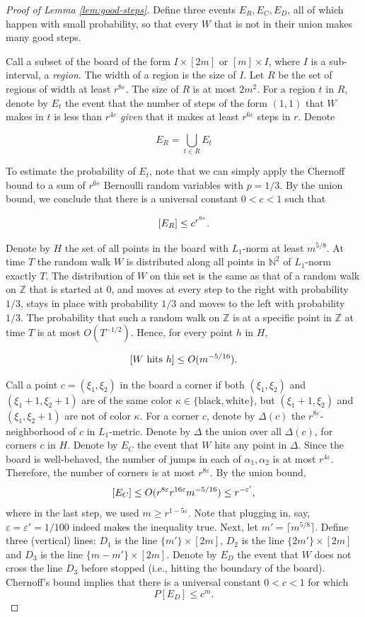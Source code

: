 \documentclass[10pt,a4paper]{article}
\theoremstyle{definition}%
\theoremstyle{plain}
\let\Pr\relax
\DeclareMathOperator*{\Pr}{\mathbb{P}}
\newcommand{\N}{\mathbb N}
\newcommand{\Z}{\mathbb Z}
\newcommand{\eps}{\varepsilon}
\begin{document}
\begin{proof}[Proof of Lemma \ref{lem:good-steps}]
    Define three events $E_R, E_C, E_D$, all of which happen with small probability, so that every $W$ that
is not in their union makes many good steps.

Call a subset of the board of the form $I \times [2m]$ or $[m] \times I$, where $I$ is a sub-interval, a \emph{region}.
The width of a region is the size of $I$. Let $R$ be the set of regions of width at least $r^{8\eps}$. The size
of $R$ is at most $2m^2$. For a region $t$ in $R$, denote by $E_t$ the event that the number of steps of the
form $(1, 1)$ that $W$ makes in $t$ is less than $r^{4\eps}$ \emph{given} that it makes at least $r^{6\eps}$ steps in $r$. Denote

\[
E_R = \bigcup_{t\in R} E_t
\]

To estimate the probability of $E_t$, note that we can simply apply the Chernoff bound to a sum of $r^{6\eps}$ Bernoulli random variables with $p = 1/3$. By the union bound, we conclude that there is a universal constant $0<c<1$ such that

\[
\Pr[E_R] \leq c^{r^{6\eps}}.
\]

Denote by $H$ the set of all points in the board with $L_1$-norm at least $m^{5/8}$. At time $T$ the
random walk $W$ is distributed along all points in $\N^2$ of $L_1$-norm exactly $T$. The distribution of
$W$ on this set is the same as that of a random walk on $\Z$ that is started at $0$, and moves at every
step to the right with probability $1/3$, stays in place with probability $1/3$ and moves to the left with probability $1/3$. The probability
that such a random walk on $\Z$ is at a specific point in $\Z$ at time $T$ is at most $O(T^{-1/2})$. Hence, for
every point $h$ in $H$,

\[
\Pr[W \text{ hits } h]\leq O(m^{-5/16}).
\]

Call a point $c = (\xi_1, \xi_2)$ in the board a corner if both $(\xi_1, \xi_2)$ and $(\xi_1 + 1, \xi_2 + 1)$ are of the same
color $\kappa \in \{\mathrm{black}, \mathrm{white}\}$, but $(\xi_1 + 1, \xi_2)$ and $(\xi_1, \xi_2 + 1)$ are not of color $\kappa$. For a corner $c$, denote
by $\Delta(c)$ the $r^{8\eps}$-neighborhood of $c$ in $L_1$-metric. Denote by $\Delta$ the union over all $\Delta(c)$, for corners
$c$ in $H$. Denote by $E_C$ the event that $W$ hits any point in $\Delta$. Since the board is well-behaved, the
number of jumps in each of $\alpha_1, \alpha_2$ is at most $r^{4\eps}$. Therefore, the number of corners is at most
$r^{8\eps}$. By the union bound,
\[
\Pr[E_C] \leq O(r^{8\eps}r^{16\eps}m^{-5/16}) \leq r^{-\eps'},
\]
where in the last step, we used $m \geq r^{1 - 5\eps}$. Note that plugging in, say, $\eps = \eps' = 1/100$ indeed makes the inequality true. Next, let $m' = \lceil m^{5/8}\rceil$. Define three (vertical) lines: $D_1$ is the line $\{m'\} \times [2m]$, $D_2$ is the line
$\{2m'\} \times [2m]$ and $D_3$ is the line $\{m - m'\} \times [2m]$. Denote by $E_D$ the event that $W$ does not cross
the line $D_3$ before stopped (i.e., hitting the boundary of the board). Chernoff’s bound implies that there is a universal constant $0<c<1$ for which
\[
P[E_D] \leq c^m.
\]


\end{proof}
\end{document}
